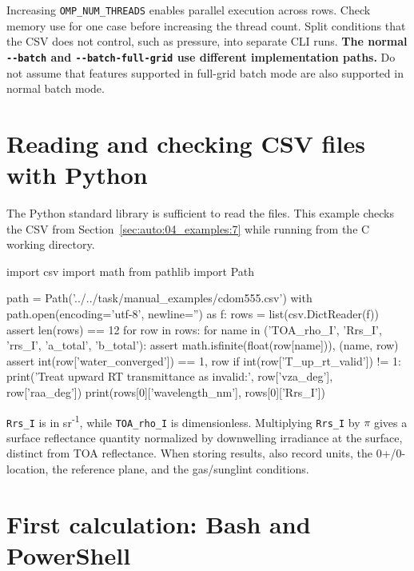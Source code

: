 Increasing \texttt{OMP\_\allowbreak{}NUM\_\allowbreak{}THREADS} enables parallel execution across rows. Check memory use for one case before increasing the thread count. Split conditions that the CSV does not control, such as pressure, into separate CLI runs. \textbf{The normal \texttt{-\allowbreak{}-\allowbreak{}batch} and \texttt{-\allowbreak{}-\allowbreak{}batch-\allowbreak{}full-\allowbreak{}grid} use different implementation paths.} Do not assume that features supported in full-grid batch mode are also supported in normal batch mode.

\section{Reading and checking CSV files with Python}
\label{sec:auto:04_examples:13}
The Python standard library is sufficient to read the files. This example checks the CSV from Section~\ref{sec:auto:04_examples:7} while running from the C working directory.


\par\noindent\begin{minipage}{\linewidth}
\begin{ManualCode}
import csv
import math
from pathlib import Path

path = Path('../../task/manual_examples/cdom555.csv')
with path.open(encoding='utf-8', newline='') as f:
    rows = list(csv.DictReader(f))
assert len(rows) == 12
for row in rows:
    for name in ('TOA_rho_I', 'Rrs_I', 'rrs_I', 'a_total', 'b_total'):
        assert math.isfinite(float(row[name])), (name, row)
    assert int(row['water_converged']) == 1, row
    if int(row['T_up_rt_valid']) != 1:
        print('Treat upward RT transmittance as invalid:', row['vza_deg'], row['raa_deg'])
print(rows[0]['wavelength_nm'], rows[0]['Rrs_I'])
\end{ManualCode}
\end{minipage}\par

\texttt{Rrs\_\allowbreak{}I} is in sr\textsuperscript{-}\textsuperscript{1}, while \texttt{TOA\_\allowbreak{}rho\_\allowbreak{}I} is dimensionless. Multiplying \texttt{Rrs\_\allowbreak{}I} by \ensuremath{\pi} gives a surface reflectance quantity normalized by downwelling irradiance at the surface, distinct from TOA reflectance. When storing results, also record units, the 0+/0- location, the reference plane, and the gas/sunglint conditions.

\section{First calculation: Bash and PowerShell}
\label{sec:auto:04_examples:14}


